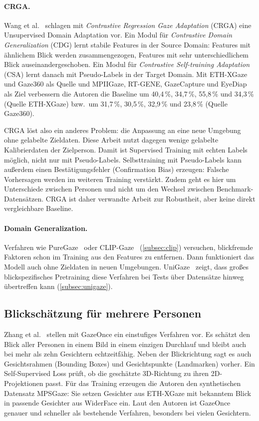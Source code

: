\paragraph{CRGA.}
Wang et al.~\cite{wang2022crga} schlagen mit \emph{Contrastive Regression Gaze
Adaptation} (CRGA) eine Unsupervised Domain Adaptation vor. Ein Modul für
\emph{Contrastive Domain Generalization} (CDG) lernt stabile Features in der
Source Domain: Features mit ähnlichem Blick werden zusammengezogen, Features mit
sehr unterschiedlichem Blick auseinandergeschoben. Ein Modul für
\emph{Contrastive Self-training Adaptation} (CSA) lernt danach mit
Pseudo-Labels in der Target Domain. Mit ETH-XGaze und Gaze360 als Quelle und
MPIIGaze, RT-GENE, GazeCapture und EyeDiap als Ziel verbessern die Autoren die
Baseline um 40,4\,\%, 34,7\,\%, 55,8\,\% und 34,3\,\% (Quelle ETH-XGaze) bzw.\
um 31,7\,\%, 30,5\,\%, 32,9\,\% und 23,8\,\% (Quelle Gaze360).

CRGA löst also ein anderes Problem: die Anpassung an eine neue Umgebung ohne
gelabelte Zieldaten. Diese Arbeit nutzt dagegen wenige gelabelte
Kalibrierdaten der Zielperson. Damit ist Supervised Training mit echten Labels
möglich, nicht nur mit Pseudo-Labels. Selbsttraining mit Pseudo-Labels kann
außerdem einen Bestätigungsfehler (Confirmation Bias) erzeugen: Falsche
Vorhersagen werden im weiteren Training verstärkt. Zudem geht es hier um
Unterschiede zwischen Personen und nicht um den Wechsel zwischen
Benchmark-Datensätzen. CRGA ist daher verwandte Arbeit zur Robustheit, aber
keine direkt vergleichbare Baseline.

\paragraph{Domain Generalization.}
Verfahren wie PureGaze~\cite{cheng2022puregaze} oder
CLIP-Gaze~\cite{yin2024clipgaze} (\cref{subsec:clip}) versuchen, blickfremde
Faktoren schon im Training aus den Features zu entfernen. Dann funktioniert
das Modell auch ohne Zieldaten in neuen Umgebungen.
UniGaze~\cite{qin2026unigaze} zeigt, dass großes blickspezifisches Pretraining
diese Verfahren bei Tests über Datensätze hinweg übertreffen kann
(\cref{subsec:unigaze}).

\subsection{Blickschätzung für mehrere Personen}
\label{subsec:gazeonce}
Zhang et al.~\cite{zhang2022gazeonce} stellen mit GazeOnce ein einstufiges
Verfahren vor. Es schätzt den Blick aller Personen in einem Bild in einem
einzigen Durchlauf und bleibt auch bei mehr als zehn Gesichtern
echtzeitfähig. Neben der Blickrichtung sagt es auch Gesichtsrahmen
(Bounding Boxes) und Gesichtspunkte (Landmarken) vorher. Ein Self-Supervised
Loss prüft, ob die geschätzte 3D-Richtung zu ihren 2D-Projektionen passt.
Für das Training erzeugen die Autoren den synthetischen Datensatz MPSGaze: Sie
setzen Gesichter aus ETH-XGaze mit bekanntem Blick in passende Gesichter aus
WiderFace ein. Laut den Autoren ist GazeOnce genauer und schneller als
bestehende Verfahren, besonders bei vielen Gesichtern.

